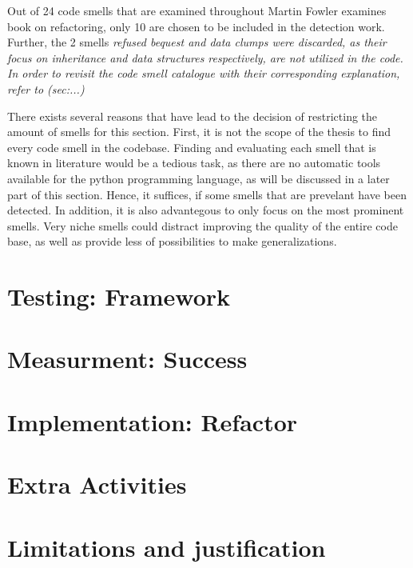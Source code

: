Out of 24 code smells that are examined throughout Martin Fowler examines book on refactoring, only 10 are chosen to be included in the detection work. Further, the 2 smells \it{refused bequest} and \it{data clumps} were discarded, as their focus on inheritance and data structures respectively, are not utilized in the code. In order to revisit the code smell catalogue with their corresponding explanation, refer to (sec:...)
 

There exists several reasons that have lead to the decision of restricting the amount of smells for this section. First, it is not the scope of the thesis to find every code smell in the codebase. Finding and evaluating each smell that is known in literature would be a tedious task, as there are no automatic tools available for the python programming language, as will be discussed in a later part of this section. Hence, it suffices, if some smells that are prevelant have been detected. In addition, it is also advantegous to only focus on the most prominent smells. Very niche smells could distract improving the quality of the entire code base, as well as provide less of possibilities to make generalizations.


\section{Testing: Framework}

\section{Measurment: Success}

\section{Implementation: Refactor}

\section{Extra Activities}

\section{Limitations and justification}
